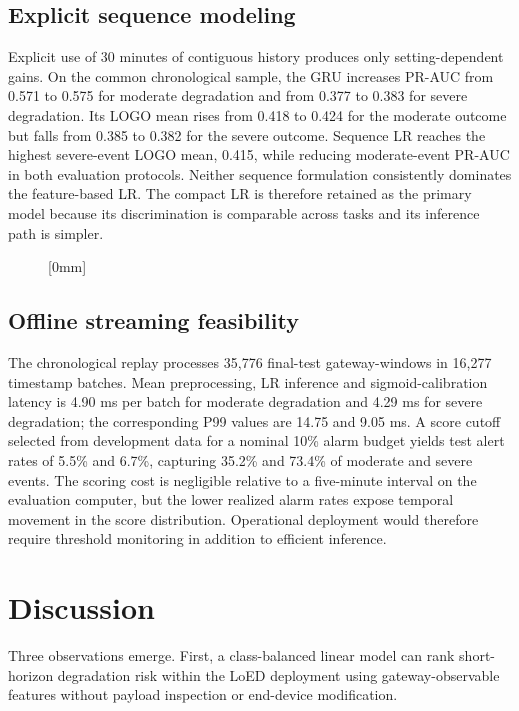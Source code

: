 \documentclass{jot}
\begin{document}
\subsection{Explicit sequence modeling}\label{s:4.11}

Explicit use of 30 minutes of contiguous history produces only setting-dependent gains. On the common chronological sample, the GRU increases PR-AUC from 0.571 to 0.575 for moderate degradation and from 0.377 to 0.383 for severe degradation. Its LOGO mean rises from 0.418 to 0.424 for the moderate outcome but falls from 0.385 to 0.382 for the severe outcome. Sequence LR reaches the highest severe-event LOGO mean, 0.415, while reducing moderate-event PR-AUC in both evaluation protocols. Neither sequence formulation consistently dominates the feature-based LR. The compact LR is therefore retained as the primary model because its discrimination is comparable across tasks and its inference path is simpler.

\begin{figure}[t]
[0mm]
\end{figure}

\subsection{Offline streaming feasibility}\label{s:4.12}

The chronological replay processes 35,776 final-test gateway-windows in 16,277 timestamp batches. Mean preprocessing, LR inference and sigmoid-calibration latency is 4.90 ms per batch for moderate degradation and 4.29 ms for severe degradation; the corresponding P99 values are 14.75 and 9.05 ms. A score cutoff selected from development data for a nominal 10\% alarm budget yields test alert rates of 5.5\% and 6.7\%, capturing 35.2\% and 73.4\% of moderate and severe events. The scoring cost is negligible relative to a five-minute interval on the evaluation computer, but the lower realized alarm rates expose temporal movement in the score distribution. Operational deployment would therefore require threshold monitoring in addition to efficient inference.

\section{Discussion}\label{s:5}
Three observations emerge. First, a class-balanced linear model can rank short-horizon degradation risk within the LoED deployment using gateway-observable features without payload inspection or end-device modification.
\end{document}
